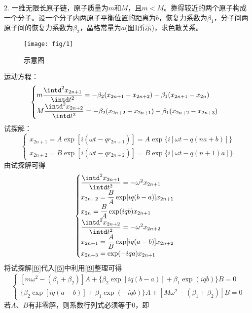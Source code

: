 \documentclass[titlepage]{article}
\begin{document}
2. 一维无限长原子链，原子质量为$ m $和$ M $，且$ m<M $。靠得较近的两个原子构成一个分子。设一个分子内两原子平衡位置的距离为$ b $，恢复力系数为$ \beta_1 $，分子间两原子间的恢复力系数为$ \beta_2 $，晶格常量为$ a $(图\ref{fig:1}所示)，求色散关系。
\begin{figure}[ht]
	\centering
	\texttt{[image: fig/1]}
	\caption{示意图}
	\label{fig:1}
\end{figure}

运动方程：
\begin{equation}\label{f5}
\begin{cases}
m\dfrac{\intd^2x_{2n+1}}{\intd t^2}=-\beta_2(x_{2n+1}-x_{2n+2})-\beta_1(x_{2n+1}-x_{2n})\\
M\dfrac{\intd^2x_{2n+2}}{\intd t^2}=-\beta_2(x_{2n+2}-x_{2n+1})-\beta_1(x_{2n+2}-x_{2n+3})
\end{cases}
\end{equation}
试探解：\begin{equation}\label{f6}
\begin{cases}
x_{2n+1}=A\exp [i(\omega t-qr_{2n+1})]=A\exp \{i[\omega t-q(na+b)]\}\\
x_{2n+2}=B\exp [i(\omega t-qr_{2n+2})]=B\exp \{i[\omega t-q(n+1)a]\}
\end{cases}
\end{equation}
由试探解可得
\begin{equation}\label{f9}
\begin{cases}
\dfrac{\intd^2x_{2n+1}}{\intd t^2}=-\omega^2x_{2n+1}\\
x_{2n+2}=\dfrac{B}{A}\exp[iq(b-a)]x_{2n+1}\\
x_{2n}=\dfrac{B}{A}\exp(iqb)x_{2n+1}\\
\dfrac{\intd^2x_{2n+2}}{\intd t^2}=-\omega^2x_{2n+2}\\
x_{2n+1}=\dfrac{A}{B}\exp[iq(a-b)]x_{2n+2}\\
x_{2n+3}=\exp(-iqa)x_{2n+1}
\end{cases}
\end{equation}
将试探解\eqref{f6}代入\eqref{f5}中利用\eqref{f9}整理可得
\begin{equation}\label{f7}
\begin{cases}
[m\omega^2-(\beta_1+\beta_2)]A+\{\beta_2\exp[iq(b-a)]+\beta_1\exp(iqb)\}B=0\\
\{\beta_2\exp[iq(a-b)]+\beta_1\exp(-iqb)\}A+[M\omega^2-(\beta_1+\beta_2)]B=0
\end{cases}
\end{equation}
若$ A $、$ B $有非零解，则系数行列式必须等于0，即
\end{document}
